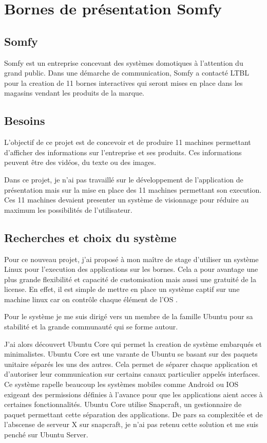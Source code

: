 \section{Bornes de présentation Somfy}

\subsection{Somfy}

Somfy est un entreprise concevant des systèmes domotiques à l'attention du grand public.
Dans une démarche de communication, Somfy a contacté LTBL pour la creation de 11 bornes interactives qui seront mises en place dans les magasins vendant les produits de la marque.

\subsection{Besoins}

L'objectif de ce projet est de concevoir et de produire 11 machines permettant d'afficher des informations sur l'entreprise et ses produits.
Ces informations peuvent être des vidéos, du texte ou des images.

Dans ce projet, je n'ai pas travaillé sur le développement de l'application de présentation mais sur la mise en place des 11 machines permettant son execution.
Ces 11 machines devaient presenter un système de visionnage pour réduire au maximum les possibilités de l'utilisateur.

\subsection{Recherches et choix du système}

Pour ce nouveau projet, j'ai proposé à mon maître de stage d'utiliser un système Linux pour l'execution des applications sur les bornes.
Cela a pour avantage une plus grande flexibilité et capacité de customisation mais aussi une gratuité de la license.
En effet, il est simple de mettre en place un système captif sur une machine linux car on contrôle chaque élément de l'OS .

Pour le système je me suis dirigé vers un membre de la famille Ubuntu pour sa stabilité et la grande communauté qui se forme autour.

J'ai alors découvert Ubuntu Core qui permet la creation de système embarqués et minimalistes.
Ubuntu Core est une varante de Ubuntu se basant sur des paquets unitaire séparés les uns des autres.
Cela permet de séparer chaque application et d'autoriser leur communication sur certains canaux particulier appelés interfaces.
Ce système rapelle beaucoup les systèmes mobiles comme Android ou IOS exigeant des permissions définies à l'avance pour que les applications aient acces à certaines fonctionnalités.
Ubuntu Core utilise Snapcraft, un gestionnaire de paquet permettant cette séparation des applications.
De pars sa complexitée et de l'abscense de serveur X sur snapcraft, je n'ai pas retenu cette solution et me suis penché sur Ubuntu Server.

